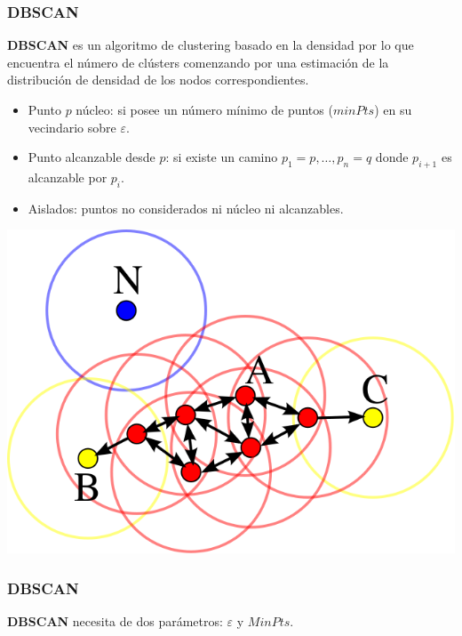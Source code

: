 \documentclass[10pt, spanish]{beamer}
\begin{document}
\begin{frame}[fragile]
\frametitle{DBSCAN}
\textbf{DBSCAN}  es un algoritmo de clustering basado en la densidad por lo que encuentra el n\'umero de cl\'usters comenzando por una estimación de la distribución
de densidad de los nodos correspondientes. \\

\begin{itemize}
\item Punto $p$ n\'ucleo: si posee un n\'umero m\'inimo de puntos ($minPts$) en su vecindario sobre $\varepsilon$.
\item Punto alcanzable desde $p$: si existe un camino $p_1=p, \ldots, p_n=q$ donde $p_{i+1}$ es alcanzable por $p_i$.
\item Aislados: puntos no considerados ni n\'ucleo ni alcanzables.

\end{itemize}
\smallskip
\begin{center}

	\includegraphics[scale=.25]{DBSCAN.png}
	
\end{center}
\end{frame}

\begin{frame}[fragile]
\frametitle{DBSCAN}
\textbf{DBSCAN} necesita de dos par\'ametros: $\varepsilon$ y $MinPts$.

\begin{algorithmic}[1]
		\Else
			\Else
			\EndIf
		
		\EndIf
	\EndFor
\EndFunction
\end{algorithmic}
\end{frame}
\end{document}
